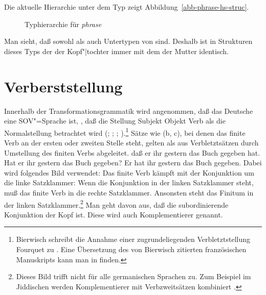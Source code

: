 Die aktuelle Hierarchie unter dem Typ  zeigt Abbildung~\vref{abb-phrase-hs-struc}.
\begin{figure}
\caption{\label{abb-phrase-hs-struc}Typhierarchie für \textit{phrase}}
\end{figure}
Man sieht, daß sowohl  als auch 
Untertypen von  sind. Deshalb ist in Strukturen 
dieses Typs der \sprw der Kopf"|tochter immer mit dem \sprw der Mutter identisch.

\section{Verberststellung}
\label{sec-v1}

Innerhalb der Transformationsgrammatik
wird angenommen, daß das Deutsche eine SOV"=Sprache ist, \dash, daß die Stellung
Subjekt Objekt Verb als die Normalstellung betrachtet wird (\citealp{Bach62a}; \citealp*[]{Bierwisch63a};
\citealp{Reis74a}; \citealp[Kapitel~1]{Thiersch78a}).\footnote{%
  Bierwisch schreibt die Annahme einer zugrundeliegenden Verbletztstellung Fourquet
  zu \citep{Fourquet57a}. Eine Übersetzung des von Bierwisch zitierten
  französischen Manuskripts kann man in 
  finden.%
}
Sätze wie (b, c), bei denen das finite Verb an der ersten oder zweiten Stelle steht,
gelten als aus Verbletztsätzen durch Umstellung des finiten Verbs abgeleitet.
\eal
\ex daß er ihr gestern das Buch gegeben hat.
\ex Hat er ihr gestern das Buch gegeben?
\ex Er hat ihr gestern das Buch gegeben.
\zl
Dabei wird folgendes Bild verwendet: Das finite Verb kämpft mit der Konjunktion um die linke Satzklammer:
Wenn die Konjunktion in der linken Satzklammer steht, muß das finite Verb in die rechte Satzklammer.
Ansonsten steht das Finitum in der linken Satzklammer.\footnote{
  Dieses Bild trifft nicht für alle germanischen Sprachen zu. Zum Beispiel im Jiddischen werden
  Komplementierer mit Verbzweitsätzen kombiniert \citep[]{Diesing2004a}.
} Man geht davon aus, daß die subordinierende Konjunktion
der Kopf ist. Diese wird auch Komplementierer genannt.

